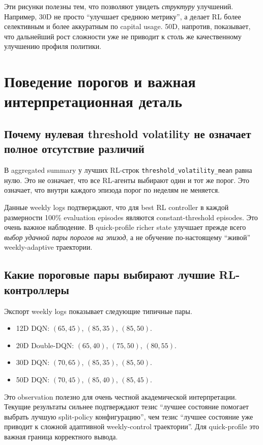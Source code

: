 \documentclass[12pt,a4paper]{article}
\begin{document}
Эти рисунки полезны тем, что позволяют увидеть \emph{структуру} улучшений. Например, 30D не просто ``улучшает среднюю метрику'', а делает RL более селективным и более аккуратным по capital usage. 50D, напротив, показывает, что дальнейший рост сложности уже не приводит к столь же качественному улучшению профиля политики.

\section{Поведение порогов и важная интерпретационная деталь}

\subsection{Почему нулевая threshold volatility не означает полное отсутствие различий}

В aggregated summary у лучших RL-строк \texttt{threshold\_volatility\_mean} равна нулю. Это не означает, что все RL-агенты выбирают один и тот же порог. Это означает, что внутри каждого эпизода порог по неделям не меняется.

Данные weekly logs подтверждают, что для best RL controller в каждой размерности 100\% evaluation episodes являются constant-threshold episodes. Это очень важное наблюдение. В quick-profile richer state улучшает прежде всего \emph{выбор удачной пары порогов на эпизод}, а не обучение по-настоящему ``живой'' weekly-adaptive траектории.

\subsection{Какие пороговые пары выбирают лучшие RL-контроллеры}

Экспорт weekly logs показывает следующие типичные пары.
\begin{itemize}[leftmargin=*]
    \item 12D DQN: $(65,45)$, $(85,35)$, $(85,50)$.
    \item 20D Double-DQN: $(65,40)$, $(75,50)$, $(80,55)$.
    \item 30D DQN: $(70,65)$, $(85,35)$, $(85,50)$.
    \item 50D DQN: $(70,45)$, $(85,40)$, $(85,45)$.
\end{itemize}

Это observation полезно для очень честной академической интерпретации. Текущие результаты сильнее подтверждают тезис ``лучшее состояние помогает выбрать лучшую split-policy конфигурацию'', чем тезис ``лучшее состояние уже приводит к сложной адаптивной weekly-control траектории''. Для quick-profile это важная граница корректного вывода.
\end{document}
